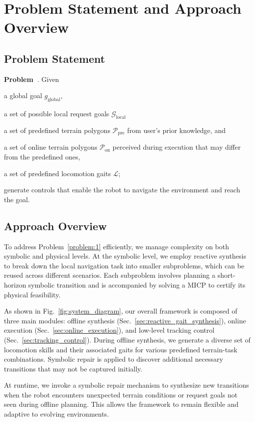 \section{Problem Statement and Approach Overview}\label{sec:problem_statement}

\subsection{Problem Statement}
\textbf{Problem~}.
Given
\begin{enumerate*}[label=(\roman*),ref=\roman*]
    \item a global goal $g_{\textrm{global}}$,
    \item a set of possible local request goals $\mathcal{G}_{\textrm{local}}$
    \item a set of predefined terrain polygons $\mathcal{P}_{\text{pre}}$ from user's prior knowledge,
    and
    \item a set of online terrain polygons $\mathcal{P}_{\text{on}}$ perceived during execution that may differ from the predefined ones,
    \item a set of predefined locomotion gaits $\mathcal{L}$;
\end{enumerate*}
generate controls that enable the robot to navigate the environment and reach the goal.

\subsection{Approach Overview}\label{sec:approach_overview}
To address Problem~\ref{problem:1} efficiently, we manage complexity on both symbolic and physical levels. At the symbolic level, we employ reactive synthesis to break down the local navigation task into smaller subproblems, which can be reused across different scenarios. Each subproblem involves planning a short-horizon symbolic transition and is accompanied by solving a MICP to certify its physical feasibility.

As shown in Fig.~\ref{fig:system_diagram}, our overall framework is composed of three main modules: offline synthesis (Sec.~\ref{sec:reactive_gait_synthesis}), online execution (Sec.~\ref{sec:online_execution}), and low-level tracking control (Sec.~\ref{sec:tracking_control}). During offline synthesis, we generate a diverse set of locomotion skills and their associated gaits for various predefined terrain-task combinations. Symbolic repair is applied to discover additional necessary transitions that may not be captured initially.

At runtime, we invoke a symbolic repair mechanism to synthesize new transitions when the robot encounters unexpected terrain conditions or request goals not seen during offline planning. This allows the framework to remain flexible and adaptive to evolving environments. 
